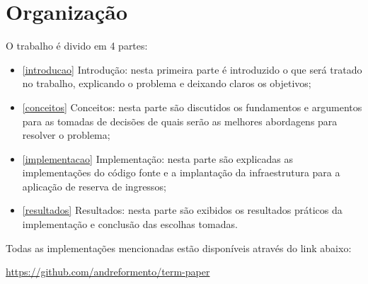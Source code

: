 \chapter{Organização}

O trabalho é divido em 4 partes:

\begin{itemize}
    \item \autoref{introducao} Introdução: nesta primeira parte é introduzido o que
          será tratado no trabalho, explicando o problema e deixando claros os objetivos;

    \item \autoref{conceitos} Conceitos: nesta parte são discutidos os fundamentos e
          argumentos para as tomadas de decisões de quais serão as melhores
          abordagens para resolver o problema;

    \item \autoref{implementacao} Implementação: nesta parte são explicadas as
          implementações do código fonte e a implantação da infraestrutura para
          a aplicação de reserva de ingressos;

    \item \autoref{resultados} Resultados: nesta parte são exibidos os resultados
          práticos da implementação e conclusão das escolhas tomadas.

\end{itemize}

Todas as implementações mencionadas estão disponíveis através do link abaixo:

\url{https://github.com/andreformento/term-paper}
